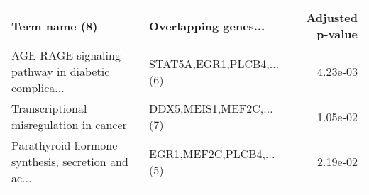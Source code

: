 \begin{tabular}{llr}
\toprule
                                     Term name (8) &     Overlapping genes... &  Adjusted p-value \\
\midrule
AGE-RAGE signaling pathway in diabetic complica... & STAT5A,EGR1,PLCB4,...(6) &          4.23e-03 \\
           Transcriptional misregulation in cancer &  DDX5,MEIS1,MEF2C,...(7) &          1.05e-02 \\
Parathyroid hormone synthesis, secretion and ac... &  EGR1,MEF2C,PLCB4,...(5) &          2.19e-02 \\
\bottomrule
\end{tabular}
